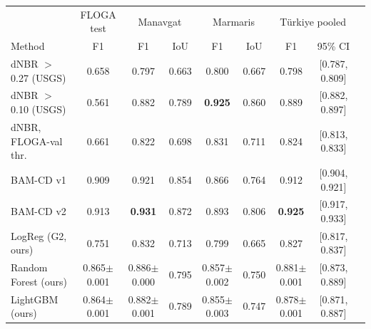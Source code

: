 \begin{tabular}{lcccccccc}
\toprule
 & FLOGA test & \multicolumn{2}{c}{Manavgat} & \multicolumn{2}{c}{Marmaris} & \multicolumn{2}{c}{T\"urkiye pooled} \\
Method & F1 & F1 & IoU & F1 & IoU & F1 & 95\% CI \\
\midrule
dNBR $>$ 0.27 (USGS) & 0.658 & 0.797 & 0.663 & 0.800 & 0.667 & 0.798 & [0.787, 0.809] \\
dNBR $>$ 0.10 (USGS) & 0.561 & 0.882 & 0.789 & \textbf{0.925} & 0.860 & 0.889 & [0.882, 0.897] \\
dNBR, FLOGA-val thr. & 0.661 & 0.822 & 0.698 & 0.831 & 0.711 & 0.824 & [0.813, 0.833] \\
BAM-CD v1 & 0.909 & 0.921 & 0.854 & 0.866 & 0.764 & 0.912 & [0.904, 0.921] \\
BAM-CD v2 & 0.913 & \textbf{0.931} & 0.872 & 0.893 & 0.806 & \textbf{0.925} & [0.917, 0.933] \\
LogReg (G2, ours) & 0.751 & 0.832 & 0.713 & 0.799 & 0.665 & 0.827 & [0.817, 0.837] \\
Random Forest (ours) & 0.865$\pm$0.001 & 0.886$\pm$0.000 & 0.795 & 0.857$\pm$0.002 & 0.750 & 0.881$\pm$0.001 & [0.873, 0.889] \\
LightGBM (ours) & 0.864$\pm$0.001 & 0.882$\pm$0.001 & 0.789 & 0.855$\pm$0.003 & 0.747 & 0.878$\pm$0.001 & [0.871, 0.887] \\
\bottomrule
\end{tabular}
